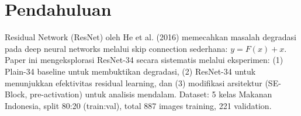 \section{Pendahuluan}

Residual Network (ResNet) oleh He et al. (2016) memecahkan masalah degradasi pada deep neural networks
melalui skip connection sederhana: $y = F(x) + x$. Paper ini mengeksplorasi ResNet-34 secara sistematis
melalui eksperimen: (1) Plain-34 baseline untuk membuktikan degradasi, (2) ResNet-34 untuk menunjukkan
efektivitas residual learning, dan (3) modifikasi arsitektur (SE-Block, pre-activation) untuk analisis
mendalam. Dataset: 5 kelas Makanan Indonesia, split 80:20 (train:val), total 887 images training, 221 validation.
